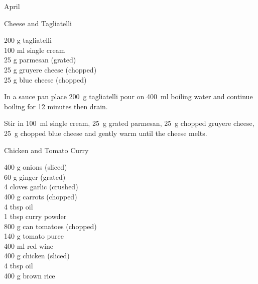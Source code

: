 \begin{menu}{April}
    \begin{recipe}{1}{Cheese and Tagliatelli}%
		\begin{ingredients}
		200 g tagliatelli  \\
	100 ml single cream  \\
	25 g parmesan (grated) \\
	25 g gruyere cheese (chopped) \\
	25 g blue cheese (chopped) \\
	
		\end{ingredients}
	
    \begin{instructions}
    \item 
      In a
      sauce pan
      place
      200~g  tagliatelli
      pour on
      400~ml  boiling water and continue boiling for 12 minutes then drain.
    \item 
        Stir in
        100~ml  single cream,
        25~g grated parmesan,
        25~g chopped gruyere cheese,
        25~g chopped blue cheese
        and gently warm until the cheese melts.
      
    \end{instructions}
    \end{recipe}%
  
    \begin{recipe}{2}{Chicken and Tomato Curry}%
		\begin{ingredients}
		400 g onions (sliced) \\
	60 g ginger (grated) \\
	4 cloves garlic (crushed) \\
	400 g carrots (chopped) \\
	4 tbsp oil  \\
	1 tbsp curry powder  \\
	800 g can tomatoes (chopped) \\
	140 g tomato puree  \\
	400 ml red wine  \\
	400 g chicken (sliced) \\
	4 tbsp oil  \\
	400 g brown rice  \\
	
		\end{ingredients}
	

\end{recipe}
\end{menu}
